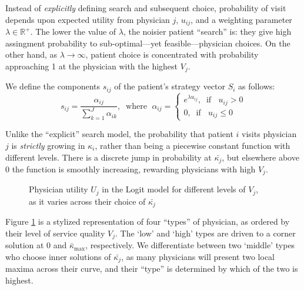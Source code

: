 \documentclass[../main.tex]{subfiles}
\begin{document}
Instead of \textit{explicitly} defining search and subsequent choice, probability of visit depends upon expected utility from physician $j$, $u_{ij}$, and a weighting parameter $\lambda \in \mathbb{R}^+$. The lower the value of $\lambda$, the noisier patient ``search'' is: they give high assingment probability to sub-optimal—yet feasible—physician choices. On the other hand, as $\lambda \rightarrow \infty$, patient choice is concentrated with probability approaching 1 at the physician with the highest $V_j$.

We define the components $s_{ij}$ of the patient's strategy vector $S_i$ as follows:
\begin{equation}
s_{ij} = \frac{\alpha_{ij}}{\sum_{k = 1}^{J} \alpha_{ik}}, \; \; \text{where } \; \alpha_{ij} = \begin{cases}
e^{\lambda u_{ij}}, \; \; \text{if } \; \; u_{ij} > 0 \\
0 , \; \; \text{if } \; \; u_{ij} \leq 0
\end{cases}
\label{eq:Logit_s}
\end{equation}

Unlike the ``explicit'' search model, the probability that patient $i$ visits physician $j$ is \textit{strictly} growing in $\kappa_i$, rather than being a piecewise constant function with different levels. There is a discrete jump in probability at $\bar{\kappa_j}$, but elsewhere above $0$ the function is smoothly increasing, rewarding physicians with high $V_j$.

\vspace{0.7em}

\begin{figure}[H]
\centering
\begin{tikzpicture}[scale=0.6]

\end{tikzpicture}
\caption{Physician utility $U_j$ in the Logit model for different levels of $V_j$,\\ as it varies across their choice of $\bar{\kappa_j}$}
\label{fig:LogitUj}
\end{figure}

Figure \ref{fig:LogitUj} is a stylized representation of four ``types'' of physician, as ordered by their level of service quality $V_j$. The `low' and `high' types are driven to a corner solution at 0 and $\bar{\kappa}_{\max}$, respectively. We differentiate between two `middle' types who choose inner solutions of $\bar{\kappa_j}$, as many physicians will present two local maxima across their curve, and their ``type'' is determined by which of the two is highest.
\end{document}
